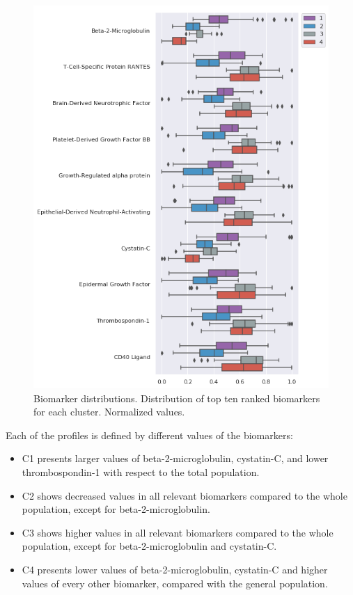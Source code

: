 \begin{figure}[!htbp]
\centering
\includegraphics[width=1.0\textwidth]{figures/cimlr/cluster_dist.png}
    \caption[Biomarker distributions.]{Biomarker distributions. Distribution of top ten ranked biomarkers for each cluster. Normalized values.}
    \label{boxplot}
\end{figure}

Each of the profiles is defined by different values of the biomarkers:

\begin{itemize}
    \item C1 presents larger values of beta-2-microglobulin, cystatin-C, and lower thrombospondin-1 with respect to the total population.
    \item C2 shows decreased values in all relevant biomarkers compared to the whole population, except for beta-2-microglobulin.
    \item C3 shows higher values in all relevant biomarkers compared to the whole population, except for beta-2-microglobulin and cystatin-C.
    \item C4 presents lower values of beta-2-microglobulin, cystatin-C and higher values of every other biomarker, compared with the general population.
\end{itemize}

